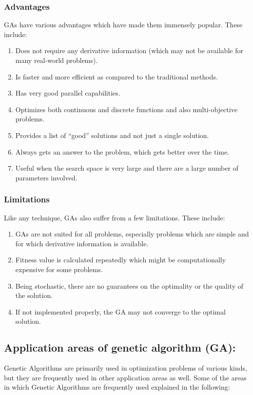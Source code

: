 \subsubsection{Advantages}
GAs have various advantages which have made them immensely popular. These include:
\begin{enumerate}
    \item{Does not require any derivative information (which may not be available for many real-world problems).}
    \item{Is faster and more efficient as compared to the traditional methods.}
    \item{Has very good parallel capabilities.}
    \item{Optimizes both continuous and discrete functions and also multi-objective problems.}
    \item{Provides a list of “good” solutions and not just a single solution.}
    \item{Always gets an answer to the problem, which gets better over the time.}
    \item{Useful when the search space is very large and there are a large number of parameters involved.}
\end{enumerate}
\subsubsection{Limitations}
Like any technique, GAs also suffer from a few limitations. These include:
\begin{enumerate}
    \item{GAs are not suited for all problems, especially problems which are simple and for which derivative information is available.}
    \item{Fitness value is calculated repeatedly which might be computationally expensive for some problems.}
    \item{Being stochastic, there are no guarantees on the optimality or the quality of the solution.}
    \item{If not implemented properly, the GA may not converge to the optimal solution.}
\end{enumerate}

\subsection{Application areas of genetic algorithm (GA):}
Genetic Algorithms are primarily used in optimization problems of
various kinds, but they are frequently used in other application areas as
well. Some of the areas in which Genetic Algorithms are frequently used
explained in the following:
